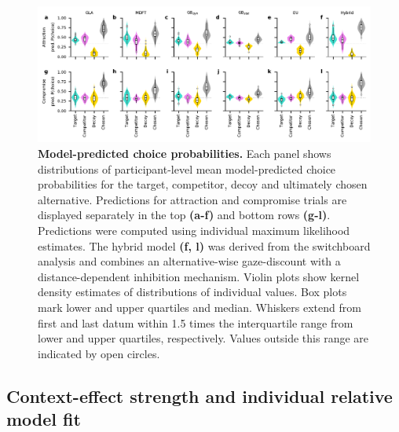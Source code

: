 \documentclass[11pt, a4paper]{article}
\begin{document}
\begin{figure}[ht!]
\begin{centering}
\includegraphics[scale=1]{../figures/S_model-predicted-choiceprobs.pdf}
\caption{\textbf{Model-predicted choice probabilities.} Each panel shows distributions of participant-level mean model-predicted choice probabilities for the target, competitor, decoy and ultimately chosen alternative. Predictions for attraction and compromise trials are displayed separately in the top \textbf{(a-f)} and bottom rows \textbf{(g-l)}. Predictions were computed using individual maximum likelihood estimates. The hybrid model \textbf{(f, l)} was derived from the switchboard analysis and combines an alternative-wise gaze-discount with a distance-dependent inhibition mechanism. Violin plots show kernel density estimates of distributions of individual values. Box plots mark lower and upper quartiles and median. Whiskers extend from first and last datum within 1.5 times the interquartile range from lower and upper quartiles, respectively. Values outside this range are indicated by open circles.}
\label{fig:model-pred-probs}
\end{centering}
\end{figure}
\clearpage

\subsection*{Context-effect strength and individual relative model fit}
\end{document}
